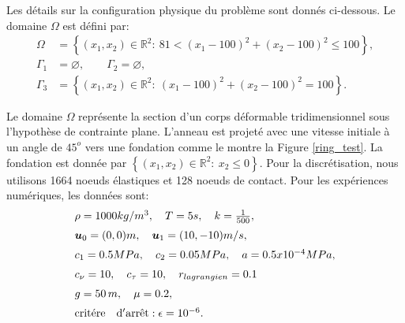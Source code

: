 Les détails sur la configuration physique du problème sont donnés ci-dessous. Le domaine $ \Omega $ est défini par:
\begin{align*}
\Omega\, &=\left\{(x_1,x_2)\in \mathbb{R}^2:  \ 81 <(x_1-100)^2
+ (x_2-100)^2 \leq 100 \right\},\\
\Gamma_1&=  \varnothing, \qquad \Gamma_2=  \varnothing,\\
\Gamma_3&=\left\{(x_1,x_2)\in \mathbb{R}^2: \ (x_1-100)^2
+ (x_2-100)^2 = 100 \right\}.
\end{align*}

Le domaine $ \Omega $ représente la section d'un corps déformable tridimensionnel sous l'hypothèse de contrainte plane. L'anneau est projeté avec une vitesse initiale à un angle de $45^o$ vers une fondation comme le montre la Figure \ref{ring_test}. La fondation est donnée par $\left\{(x_1,x_2)\in \mathbb{R}^2:  \ x_2 \leq 0  \right\}$. Pour la discrétisation, nous utilisons 1664 noeuds élastiques et 128 noeuds de contact. Pour les expériences numériques, les données sont:
\begin{eqnarray}
\begin{array}{l}
\rho = 1000 kg/m^3, \quad T=5s,  \quad k=\frac{1}{500}, \nonumber \\[2mm]
\mbox{\boldmath{$u$}}_0=(0,0) m,  \quad \mbox{\boldmath{$u$}}_1=(10,-10) m/s, \nonumber \\[2mm]
c_1 = 0.5 MPa, \quad c_2 = 0.05 MPa, \quad a = 0.5x10^{-4} MPa,  \nonumber \\[2mm]
c_\nu=10, \quad c_\tau=10,\quad r_{lagrangien}=0.1\nonumber\\[2mm]
g=50\,m,  \quad \mu = 0.2, \nonumber \\[2mm]
{\rm crit\acute{e}re \quad d'arr\hat{e}t}: \epsilon=10^{-6}.
\end{array}
\end{eqnarray}

